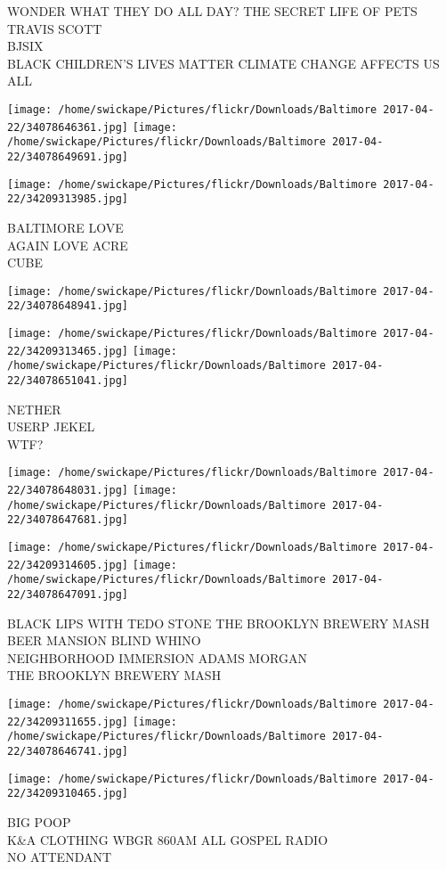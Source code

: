\documentclass[10pt,letterpaper]{article}
\begin{document}
WONDER WHAT THEY DO ALL DAY?  THE SECRET LIFE OF PETS\\
TRAVIS SCOTT\\
BJSIX\\
BLACK CHILDREN'S LIVES MATTER CLIMATE CHANGE AFFECTS US ALL\\
\pagebreak

\texttt{[image: /home/swickape/Pictures/flickr/Downloads/Baltimore 2017-04-22/34078646361.jpg]}
\texttt{[image: /home/swickape/Pictures/flickr/Downloads/Baltimore 2017-04-22/34078649691.jpg]}

\texttt{[image: /home/swickape/Pictures/flickr/Downloads/Baltimore 2017-04-22/34209313985.jpg]}

BALTIMORE LOVE\\
AGAIN LOVE ACRE\\
CUBE\\
\pagebreak

\texttt{[image: /home/swickape/Pictures/flickr/Downloads/Baltimore 2017-04-22/34078648941.jpg]}

\vspace{0.25in}
\texttt{[image: /home/swickape/Pictures/flickr/Downloads/Baltimore 2017-04-22/34209313465.jpg]}
\texttt{[image: /home/swickape/Pictures/flickr/Downloads/Baltimore 2017-04-22/34078651041.jpg]}

NETHER\\
USERP JEKEL\\
WTF?\\
\pagebreak

\texttt{[image: /home/swickape/Pictures/flickr/Downloads/Baltimore 2017-04-22/34078648031.jpg]}
\texttt{[image: /home/swickape/Pictures/flickr/Downloads/Baltimore 2017-04-22/34078647681.jpg]}

\texttt{[image: /home/swickape/Pictures/flickr/Downloads/Baltimore 2017-04-22/34209314605.jpg]}
\texttt{[image: /home/swickape/Pictures/flickr/Downloads/Baltimore 2017-04-22/34078647091.jpg]}

BLACK LIPS WITH TEDO STONE THE BROOKLYN BREWERY MASH\\
BEER MANSION BLIND WHINO\\
NEIGHBORHOOD IMMERSION ADAMS MORGAN\\
THE BROOKLYN BREWERY MASH\\
\pagebreak

\texttt{[image: /home/swickape/Pictures/flickr/Downloads/Baltimore 2017-04-22/34209311655.jpg]}
\texttt{[image: /home/swickape/Pictures/flickr/Downloads/Baltimore 2017-04-22/34078646741.jpg]}

\texttt{[image: /home/swickape/Pictures/flickr/Downloads/Baltimore 2017-04-22/34209310465.jpg]}

BIG POOP\\
K\&A CLOTHING WBGR 860AM ALL GOSPEL RADIO\\
NO ATTENDANT\\
\pagebreak
\end{document}
